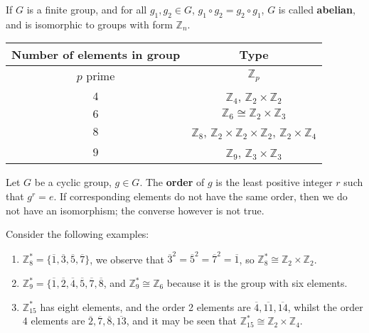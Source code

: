 \documentclass[letter-paper]{tufte-book}
\newenvironment{example}[1][Example]{\begin{trivlist}
\item[\hskip \labelsep {\bfseries #1}]}{\end{trivlist}}
\newcommand\Def[1]{\textbf{#1}}
\begin{document}
If $G$ is a finite group, and for all $g_1, g_2\in G$, $g_1 \circ g_2=g_2\circ
g_1$, $G$ is called \Def{abelian}, and is isomorphic to groups with form
$\mathbb{Z}_n$.
\begin{table}[h]
  \begin{center}
  \begin{tabular}{c|c}
		Number of elements in group & Type\\
		\hline
		$p$ prime & $\mathbb{Z}_p$\\
		$4$ & $\mathbb{Z}_4$, $\mathbb{Z}_2\times\mathbb{Z}_2$\\
		$6$ & $\mathbb{Z}_6\cong\mathbb{Z}_2\times\mathbb{Z}_3$\\
		$8$ & $\mathbb{Z}_8$, $\mathbb{Z}_2\times\mathbb{Z}_2\times\mathbb{Z}_2$,
		$\mathbb{Z}_2\times\mathbb{Z}_4$\\
		$9$ & $\mathbb{Z}_9$, $\mathbb{Z}_3\times\mathbb{Z}_3$
	\end{tabular}\end{center}
\end{table}

Let $G$ be a cyclic group, $g\in G$. The \Def{order} of $g$ is the least
positive integer $r$ such that $g^r=e$. If corresponding elements do not have
the same order, then we do not have an isomorphism; the converse however is not
true.
\begin{example}
  Consider the following examples:
  \begin{enumerate}
    \item $\mathbb{Z}_8^*=\{\overline{1}, \overline{3}, \overline{5},
    \overline{7}\}$, we observe that
    $\overline{3}^2= \overline{5}^2= \overline{7}^2= \overline{1}$, so
    $\mathbb{Z}_8^* \cong\mathbb{Z}_2\times\mathbb{Z}_2$.
    \item $\mathbb{Z}_9^*=\{\overline{1}, \overline{2}, \overline{4},
    \overline{5}, \overline{7}, \overline{8}$, and
    $\mathbb{Z}_9^*\cong\mathbb{Z}_6$ because it is the group with six elements.
    \item $\mathbb{Z}_15^*$ has eight elements, and the order 2 elements are
    $\overline{4}, \overline{11}, \overline{14}$, whilst the order 4 elements
    are $\overline{2}, \overline{7}, \overline{8}, \overline{13}$, and it may be
    seen that $\mathbb{Z}_15^*\cong\mathbb{Z}_2\times\mathbb{Z}_4$.
  \end{enumerate}
\end{example}

\end{document}
